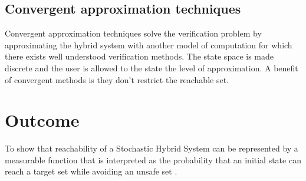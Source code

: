 \documentclass{article}
\begin{document}
\subsection{Convergent approximation techniques}
Convergent approximation techniques solve the verification problem by approximating the hybrid system with another model of computation for which there exists well understood verification methods. The state space is made discrete and the user is allowed to the state the level of approximation. A benefit of convergent methods is they don’t restrict the reachable set.

\section{Outcome}
To show that reachability of a Stochastic Hybrid System can be represented by a measurable function that is interpreted as the probability that an initial state can reach a target set while avoiding an unsafe set .



\end{document}
